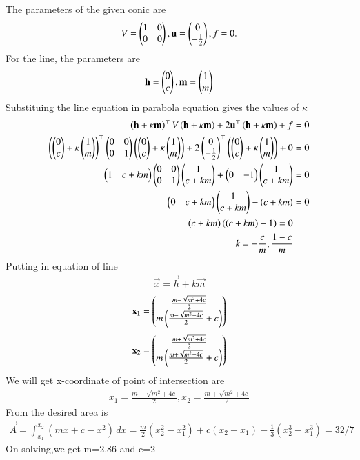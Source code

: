 \documentclass[journal]{IEEEtran}
\numberwithin{equation}{enumi}
\numberwithin{figure}{enumi}
\begin{document}
The parameters of the given conic are
\begin{align}
V=\begin{pmatrix}
1 & 0\\
0 & 0
\end{pmatrix},
\mathbf{u}=\begin{pmatrix}0\\-\frac{1}{2}\end{pmatrix},
f=0.
\end{align} 
For the line, the parameters are
\begin{align}
\mathbf{h} = \begin{pmatrix}
0\\
c
\end{pmatrix},
\mathbf{m} = \begin{pmatrix}1 \\ m\end{pmatrix}
\end{align}
Substituing the line equation in parabola equation gives the values of $\kappa$
\begin{align}
\left(\mathbf{h}+\kappa\mathbf{m}\right)^\top V \left(\mathbf{h}+\kappa\mathbf{m}\right) + 2\mathbf{u}^\top\left(\mathbf{h}+\kappa\mathbf{m}\right) + f &= 0\\
\left(\begin{pmatrix}0\\c\end{pmatrix}+\kappa\begin{pmatrix}1\\m\end{pmatrix}\right)^\top\begin{pmatrix}0 & 0\\0 & 1\end{pmatrix}\left(\begin{pmatrix}0\\c\end{pmatrix}+\kappa\begin{pmatrix}1\\m\end{pmatrix}\right) + 2\begin{pmatrix}0\\-\frac{1}{2}\end{pmatrix}^\top\left(\begin{pmatrix}0\\c\end{pmatrix}+\kappa\begin{pmatrix}1\\m\end{pmatrix}\right) + 0 &= 0\\
\begin{pmatrix}1&c+km\end{pmatrix}\begin{pmatrix}0&0\\0&1\end{pmatrix}\begin{pmatrix}1\\c+km\end{pmatrix}+\begin{pmatrix}0&-1\end{pmatrix}\begin{pmatrix}1\\c+km\end{pmatrix} &= 0\\
\begin{pmatrix}0&c+km\end{pmatrix}\begin{pmatrix}1\\c+km\end{pmatrix}-\left(c+km\right) &= 0\\
\left(c+km\right)\left(\left(c+km\right)-1\right)=0\\
k=-\frac{c}{m},\frac{1-c}{m}\\
\end{align}
Putting in equation of line \\
\begin{align}
\vec{x}=\vec{h}+k\vec{m}
\end{align}
\begin{align}
\mathbf{x_1}=\begin{pmatrix}\frac{m-\sqrt{m^2+4c}}{2} \\ m\left(\frac{m-\sqrt{m^2+4c}}{2} +c\right)\end{pmatrix}
\end{align}
\begin{align}
\mathbf{x_2}=\begin{pmatrix}\frac{m+\sqrt{m^2+4c}}{2} \\ m\left(\frac{m+\sqrt{m^2+4c}}{2} +c\right)\end{pmatrix}
\end{align}
We will get x-coordinate of point of intersection are 
\begin{align}
    x_1=\frac{m-\sqrt{m^2+4c}}{2},x_2=\frac{m+\sqrt{m^2+4c}}{2}
\end{align}
From the desired area is 
\begin{align}
\vec{A}=\int_{x_1}^{x_2} (mx+c-x^2) \,dx = \frac{m}{2}(x_2^2-x_1^2) + c(x_2-x_1) -\frac{1}{3}(x_2^3 - x_1^3) = 32/7
\end{align}
On solving,we get m=2.86 and c=2
 
\end{document}
